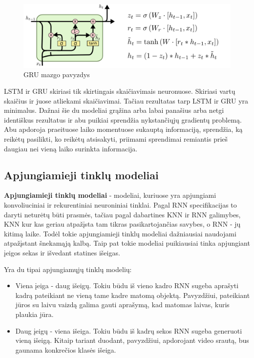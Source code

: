 \documentclass{VUMIFPSbakalaurinis}
\begin{document}
\begin{figure}[H]
	\centering
	\includegraphics[scale=0.5, trim={0 0 12.9cm 0}, clip]{img/gru}
	\caption{GRU mazgo pavyzdys}
	\label{img:gru}
\end{figure}


LSTM ir GRU skiriasi tik skirtingais skaičiavimais neuronuose. Skiriasi vartų skaičius ir juose atliekami skaičiavimai. Tačiau rezultatas tarp LSTM ir GRU yra minimalus. Dažnai šie du modeliai grąžina arba labai panašius arba netgi identiškus rezultatus ir abu puikiai sprendžia nykstančiųjų gradientų problemą. Abu apdoroja praeituose laiko momentuose sukauptą informaciją, sprendžia, ką reikėtų pasilikti, ko reikėtų atsisakyti, priimami sprendimai remiantis prieš daugiau nei vieną laiko surinkta informacija.

\subsection{Apjungiamieji tinklų modeliai}

\textbf{Apjungiamieji tinklų modeliai} - modeliai, kuriuose yra apjungiami konvoliuciniai ir rekurentiniai neuroniniai tinklai. Pagal RNN specifikacijas to daryti neturėtų būti prasmės, tačiau pagal dabartines KNN ir RNN galimybes, KNN kur kas geriau atpažįsta tam tikras pasikartojančias savybes, o RNN - jų kitimą laike. Todėl tokie apjungiamieji tinklų modeliai dažniausiai naudojami atpažįstant šnekamąją kalbą. Taip pat tokie modeliai puikiausiai tinka apjungiant įeigos sekas ir išvedant statines išeigas. 

Yra du tipai apjungiamųjų tinklų modelių:
\begin{itemize}
	\item Viena įeiga - daug išeigų. Tokiu būdu iš vieno kadro RNN sugeba aprašyti kadrą pateikiant ne vieną tame kadre matomą objektą. Pavyzdžiui, pateikiant jūros su laivu vaizdą galima gauti aprašymą, kad matomas laivas, kuris plaukia jūra.
	\item Daug įeigų - viena išeiga. Tokiu būdu iš kadrų sekos RNN sugeba generuoti vieną išeigą. Kitaip tariant duodant, pavyzdžiui, apdorojant video srautą, bus gaunama konkrečios klasės išeiga.
\end{itemize}
\end{document}
